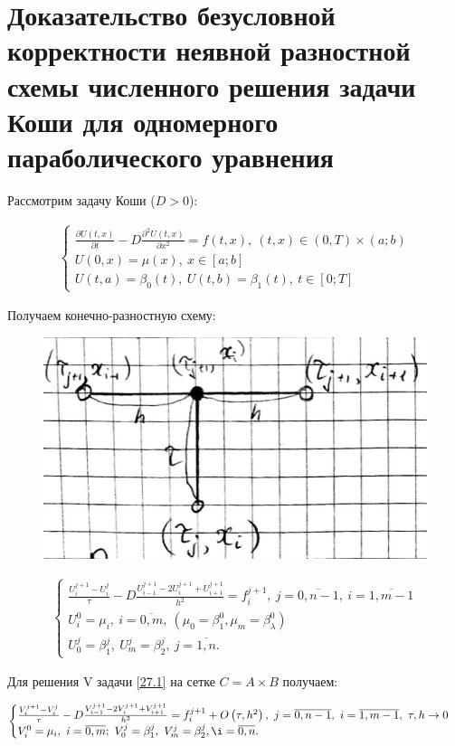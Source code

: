 \documentclass[__main__.tex]{subfiles}
\begin{document}
\section{Доказательство безусловной корректности неявной разностной схемы численного решения задачи Коши для одномерного параболического уравнения}

Рассмотрим задачу Коши ($D>0$):

\begin{gather}\label{27.1}
\begin{cases}
\frac{\partial U \left(t,x\right)}{\partial t} - D \frac{\partial^2 U \left( t,x \right)}{\partial x^2} = f \left( t,x \right), \ \left(t,x\right) \in \left(0,T\right) \times \left( a;b \right) \\
U\left(0,x\right) = \mu \left(x\right), \ x \in \left[a;b\right] \\
U(t,a) = \beta_0 \left(t\right), \ U\left( t,b \right) = \beta_1 \left(t\right), \ t\in\left[0;T\right]
\end{cases}
\end{gather}

Получаем конечно-разностную схему:

\begin{figure}[h!]
	\centering
	\includegraphics[width=0.03\linewidth]{img/img_27-1}
	\caption{}
	\label{img_27.1}
\end{figure}

\begin{gather}\label{27.2}
\begin{cases}
\frac{U^{j+1}_i - U^j_i}{\tau} - D \frac{U^{j+1}_{i-1} - 2 U^{j+1}_i+U^{j+1}_{i+1}}{h^2} = f^{j+1}_i, \ j = \overline{0,n-1}, \ i = \overline{1,m-1} \\
U^0_i = \mu_i, \ i = \overline{0,m}, \ \left( \mu_0 = \beta^0_1, \mu_m = \beta^0_\lambda \right) \\
U^j_0 = \beta^j_1, \ U^j_m = \beta^j_2, \ j = \overline{1,n}.
\end{cases}
\end{gather}

Для решения V задачи \ref{27.1} на сетке $C = A \times B$ получаем:

\begin{gather} \label{27.3}
\begin{cases}
\frac{V^{j+1}_i - V^j_i}{\tau} - D \frac{V^{j+1}_{i-1} - 2V^{j+1}_i +V^{j+1}_{i+1}}{h^2} = f^{j+1}_i + O \left( \tau, h^2 \right), \ j = \overline{0,n-1}, \ i = \overline{1,m-1}, \ \tau, h \rightarrow 0 \\
V^0_i = \mu_i, \ i = \overline{0,m}; \ V^j_0 = \beta^j_1, \ V^j_m = \beta^j_2, \i= \overline{0,n}.
\end{cases}
\end{gather}
\end{document}
